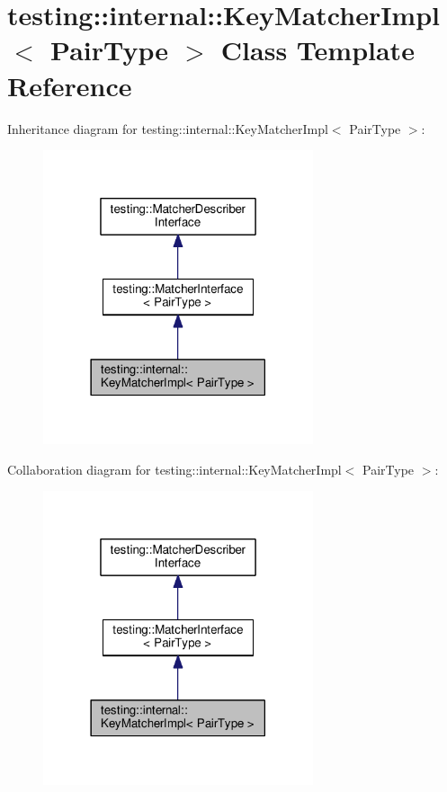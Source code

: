 \hypertarget{classtesting_1_1internal_1_1KeyMatcherImpl}{}\section{testing\+:\+:internal\+:\+:Key\+Matcher\+Impl$<$ Pair\+Type $>$ Class Template Reference}
\label{classtesting_1_1internal_1_1KeyMatcherImpl}


Inheritance diagram for testing\+:\+:internal\+:\+:Key\+Matcher\+Impl$<$ Pair\+Type $>$\+:\nopagebreak
\begin{figure}[H]
\begin{center}
\leavevmode
\includegraphics[width=225pt]{classtesting_1_1internal_1_1KeyMatcherImpl__inherit__graph}
\end{center}
\end{figure}


Collaboration diagram for testing\+:\+:internal\+:\+:Key\+Matcher\+Impl$<$ Pair\+Type $>$\+:\nopagebreak
\begin{figure}[H]
\begin{center}
\leavevmode
\includegraphics[width=225pt]{classtesting_1_1internal_1_1KeyMatcherImpl__coll__graph}
\end{center}
\end{figure}
